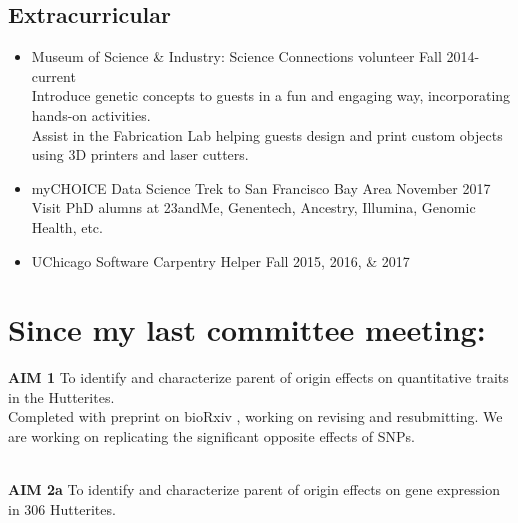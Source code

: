 \documentclass[a4paper, 11pt]{article}
\begin{document}
\subsection*{Extracurricular}
\begin{itemize}
	\item Museum of Science \& Industry: Science Connections volunteer \hfill Fall 2014-current \\
		Introduce genetic concepts to guests in a fun and engaging way, incorporating hands-on activities.\\Assist in the Fabrication Lab helping guests design and print custom objects using 3D printers and laser cutters.

	\item myCHOICE Data Science Trek to San Francisco Bay Area \hfill November 2017 \\
		Visit PhD alumns at 23andMe, Genentech, Ancestry, Illumina, Genomic Health, etc.
		\item UChicago Software Carpentry Helper \hfill Fall 2015, 2016, \& 2017
\end{itemize}




\newpage

\section*{Since my last committee meeting:} %
\textbf{AIM 1} To identify and characterize parent of origin effects on quantitative traits in the Hutterites. \\

	Completed with preprint on bioRxiv \cite{Mozaffari:dg}, working on revising and resubmitting. We are working on replicating the significant opposite effects of SNPs.
	
 \textbf{\\AIM 2a} To identify and characterize parent of origin effects on gene expression in 306 Hutterites.\\
 
\end{document}
